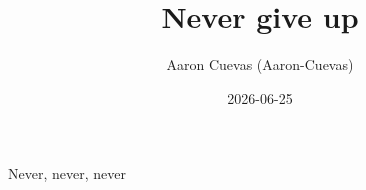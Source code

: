 \documentclass[11pt]{article}
\title{Never give up}
\author{Aaron Cuevas (Aaron-Cuevas)}
\date{2026-06-25}
\begin{document}
\maketitle
Never, never, never
%
%
\end{document}
